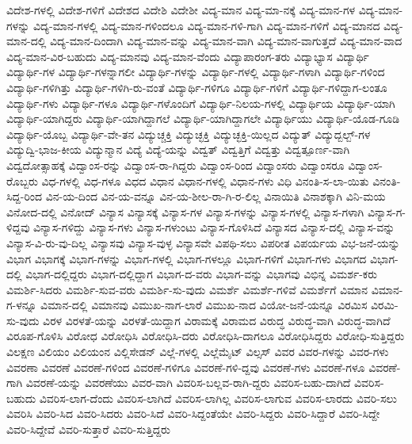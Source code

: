 {ವಿದೇಶ-ಗಳಲ್ಲಿ
ವಿದೇಶ-ಗಳಿಗೆ
ವಿದೇಶದ
ವಿದೇಶಿ
ವಿದೇಶೀ
ವಿದ್ಯ-ಮಾನ
ವಿದ್ಯ-ಮಾ-ನಕ್ಕೆ
ವಿದ್ಯ-ಮಾನ-ಗಳ
ವಿದ್ಯ-ಮಾನ-ಗಳನ್ನು
ವಿದ್ಯ-ಮಾನ-ಗಳಲ್ಲಿ
ವಿದ್ಯ-ಮಾನ-ಗಳಿಂದಲೂ
ವಿದ್ಯ-ಮಾನ-ಗಳಿ-ಗಾಗಿ
ವಿದ್ಯ-ಮಾನ-ಗಳಿಗೆ
ವಿದ್ಯ-ಮಾನದ
ವಿದ್ಯ-ಮಾನ-ದಲ್ಲಿ
ವಿದ್ಯ-ಮಾನ-ದಿಂದಾಗಿ
ವಿದ್ಯ-ಮಾನ-ವನ್ನು
ವಿದ್ಯ-ಮಾನ-ವಾಗಿ
ವಿದ್ಯ-ಮಾನ-ವಾಗುತ್ತದೆ
ವಿದ್ಯ-ಮಾನ-ವಾದ
ವಿದ್ಯ-ಮಾನ-ವಿರ-ಬಹುದು
ವಿದ್ಯ-ಮಾನವು
ವಿದ್ಯ-ಮಾನ-ವೆಂದು
ವಿದ್ಯಾಪಾರಂಗ-ತರು
ವಿದ್ಯಾಭ್ಯಾಸ
ವಿದ್ಯಾರ್ಥಿ
ವಿದ್ಯಾರ್ಥಿ-ಗಳ
ವಿದ್ಯಾರ್ಥಿ-ಗಳನ್ನಾಗಲೀ
ವಿದ್ಯಾರ್ಥಿ-ಗಳನ್ನು
ವಿದ್ಯಾರ್ಥಿ-ಗಳಲ್ಲಿ
ವಿದ್ಯಾರ್ಥಿ-ಗಳಾಗಿ
ವಿದ್ಯಾರ್ಥಿ-ಗಳಿಂದ
ವಿದ್ಯಾರ್ಥಿ-ಗಳಿಗಿತ್ತು
ವಿದ್ಯಾರ್ಥಿ-ಗಳಿಗಿ-ರು-ವಂತೆ
ವಿದ್ಯಾರ್ಥಿ-ಗಳಿಗೂ
ವಿದ್ಯಾರ್ಥಿ-ಗಳಿಗೆ
ವಿದ್ಯಾರ್ಥಿ-ಗಳಿದ್ದಾಗ-ಲಂತೂ
ವಿದ್ಯಾರ್ಥಿ-ಗಳು
ವಿದ್ಯಾರ್ಥಿ-ಗಳೂ
ವಿದ್ಯಾರ್ಥಿ-ಗಳೊಂದಿಗೆ
ವಿದ್ಯಾರ್ಥಿ-ನಿಲಯ-ಗಳಲ್ಲಿ
ವಿದ್ಯಾರ್ಥಿಯ
ವಿದ್ಯಾರ್ಥಿ-ಯಾಗಿ
ವಿದ್ಯಾರ್ಥಿ-ಯಾಗಿದ್ದರು
ವಿದ್ಯಾರ್ಥಿ-ಯಾಗಿದ್ದಾಗಲೆ
ವಿದ್ಯಾರ್ಥಿ-ಯಾಗಿದ್ದಾಗಲೇ
ವಿದ್ಯಾರ್ಥಿಯು
ವಿದ್ಯಾರ್ಥಿ-ಯೊಡ-ಗೂಡಿ
ವಿದ್ಯಾರ್ಥಿ-ಯೊಬ್ಬ
ವಿದ್ಯಾರ್ಥಿ-ವೇ-ತನ
ವಿದ್ಯುಚ್ಚಕ್ತಿ
ವಿದ್ಯುಚ್ಛಕ್ತಿ
ವಿದ್ಯುಚ್ಛಕ್ತಿ-ಯಿಲ್ಲದ
ವಿದ್ಯುತ್
ವಿದ್ಯುದ್ಬಲ್ಬ್-ಗಳ
ವಿದ್ಯುದ್ವಿ-ಭಾಜ-ಕೀಯ
ವಿದ್ಯುನ್ಮಾನ
ವಿದ್ಯೆ
ವಿದ್ಯೆ-ಯನ್ನು
ವಿದ್ವತ್
ವಿದ್ವತ್ತಿಗೆ
ವಿದ್ವತ್ತು
ವಿದ್ವತ್ಪೂರ್ಣ-ವಾಗಿ
ವಿದ್ವದೋತ್ಸಾಹಕ್ಕೆ
ವಿದ್ವಾಂಸ-ರನ್ನು
ವಿದ್ವಾಂಸ-ರಾ-ಗಿದ್ದರು
ವಿದ್ವಾಂಸ-ರಿಂದ
ವಿದ್ವಾಂಸರು
ವಿದ್ವಾಂಸರೂ
ವಿದ್ವಾಂಸ-ರೊಬ್ಬರು
ವಿಧ-ಗಳಲ್ಲಿ
ವಿಧ-ಗಳೂ
ವಿಧದ
ವಿಧಾನ
ವಿಧಾನ-ಗಳಲ್ಲಿ
ವಿಧಾನ-ಗಳು
ವಿಧಿ
ವಿನಂತಿ-ಸ-ಲಾ-ಯಿತು
ವಿನಂತಿ-ಸಿದ್ದ-ರಿಂದ
ವಿನ-ಯ-ದಿಂದ
ವಿನ-ಯ-ವನ್ನೂ
ವಿನ-ಯ-ಶೀಲ-ರಾ-ಗಿ-ರ-ಲಿಲ್ಲ
ವಿನಾಯಿತಿ
ವಿನಾಶಕ್ಕಾಗಿ
ವಿನಿ-ಮಯ
ವಿನೋದ-ದಲ್ಲಿ
ವಿನೋದ್
ವಿನ್ಯಾಸ
ವಿನ್ಯಾಸಕ್ಕೆ
ವಿನ್ಯಾಸ-ಗಳ
ವಿನ್ಯಾಸ-ಗಳನ್ನು
ವಿನ್ಯಾಸ-ಗಳಲ್ಲಿ
ವಿನ್ಯಾಸ-ಗಳಾಗಿ
ವಿನ್ಯಾಸ-ಗ-ಳಿದ್ದವು
ವಿನ್ಯಾಸ-ಗಳಿದ್ದು
ವಿನ್ಯಾಸ-ಗಳು
ವಿನ್ಯಾಸ-ಗಳುಂಟು
ವಿನ್ಯಾಸ-ಗೊಳಿಸಿದೆ
ವಿನ್ಯಾಸದ
ವಿನ್ಯಾಸ-ದಲ್ಲಿ
ವಿನ್ಯಾಸ-ವನ್ನು
ವಿನ್ಯಾಸ-ವಿ-ರು-ವು-ದಿಲ್ಲ
ವಿನ್ಯಾಸವು
ವಿನ್ಯಾಸ-ವುಳ್ಳ
ವಿನ್ಯಾಸವೇ
ವಿಪಥಿ-ಸಲು
ವಿಪರೀತ
ವಿಪರ್ಯಯ
ವಿಭ-ಜನೆ-ಯನ್ನು
ವಿಭಾಗ
ವಿಭಾಗಕ್ಕೆ
ವಿಭಾಗ-ಗಳನ್ನು
ವಿಭಾಗ-ಗಳಲ್ಲಿ
ವಿಭಾಗ-ಗಳಲ್ಲೂ
ವಿಭಾಗ-ಗಳಿಗೆ
ವಿಭಾಗ-ಗಳು
ವಿಭಾಗದ
ವಿಭಾಗ-ದಲ್ಲಿ
ವಿಭಾಗ-ದಲ್ಲಿದ್ದರು
ವಿಭಾಗ-ದಲ್ಲಿದ್ದಾಗ
ವಿಭಾಗ-ದ-ವರು
ವಿಭಾಗ-ವನ್ನು
ವಿಭಾಗವು
ವಿಭಿನ್ನ
ವಿಮರ್ಶ-ಕರು
ವಿಮರ್ಶಿ-ಸಿದರು
ವಿಮರ್ಶಿ-ಸುವ-ವರು
ವಿಮರ್ಶಿ-ಸು-ವುದು
ವಿಮರ್ಶೆ
ವಿಮರ್ಶೆ-ಗಳಿವೆ
ವಿಮರ್ಶೆಗೆ
ವಿಮಾನ
ವಿಮಾನ-ಗ-ಳನ್ನೂ
ವಿಮಾನ-ದಲ್ಲಿ
ವಿಮಾನವು
ವಿಮುಖ-ನಾಗ-ಲಾರೆ
ವಿಮುಖ-ನಾದ
ವಿಯೋ-ಜನೆ-ಯನ್ನೂ
ವಿರಮಿಸ
ವಿರಮಿ-ಸು-ವುದು
ವಿರಳ
ವಿರಳತೆ-ಯನ್ನು
ವಿರಳತೆ-ಯಿದ್ದಾಗ
ವಿರಾಮಕ್ಕೆ
ವಿರಾಮದ
ವಿರುದ್ಧ
ವಿರುದ್ಧ-ವಾಗಿ
ವಿರುದ್ಧ-ವಾಗಿದೆ
ವಿರೂಪ-ಗೊಳಿಸಿ
ವಿರೋಧ
ವಿರೋಧಿಸಿ
ವಿರೋಧಿಸಿ-ದರು
ವಿರೋಧಿಸಿ-ದಾಗಲೂ
ವಿರೋಧಿಸಿದ್ದರು
ವಿರೋಧಿ-ಸುತ್ತಿದ್ದರು
ವಿಲಕ್ಷಣ
ವಿಲಿಯಂ
ವಿಲಿಯಂನ
ವಿಲ್ಲಿಸೇಡನ್
ವಿಲ್ಲೆ-ಗಳಲ್ಲಿ
ವಿಲ್ಲೆಮೈಟ್
ವಿಲ್ಸಸ್
ವಿವರ
ವಿವರ-ಗಳನ್ನು
ವಿವರ-ಗಳು
ವಿವರಣಾ
ವಿವರಣೆ
ವಿವರಣೆ-ಗಳಿಂದ
ವಿವರಣೆ-ಗಳಿಗೂ
ವಿವರಣೆ-ಗಳಿ-ದ್ದವು
ವಿವರಣೆ-ಗಳು
ವಿವರಣೆ-ಗಳೂ
ವಿವರಣೆ-ಗಾಗಿ
ವಿವರಣೆ-ಯನ್ನು
ವಿವರಣೆಯು
ವಿವರ-ವಾಗಿ
ವಿವರಿಸ-ಬಲ್ಲವ-ರಾಗಿ-ದ್ದರು
ವಿವರಿಸ-ಬಹು-ದಾಗಿದೆ
ವಿವರಿಸ-ಬಹುದು
ವಿವರಿಸ-ಲಾಗ-ದೆಂದು
ವಿವರಿಸ-ಲಾಗಿದೆ
ವಿವರಿಸ-ಲಾಗಿಲ್ಲ
ವಿವರಿಸ-ಲಾಗುವ
ವಿವರಿಸ-ಲಾರದು
ವಿವರಿ-ಸಲು
ವಿವರಿಸಿ
ವಿವರಿ-ಸಿದ
ವಿವರಿ-ಸಿದರು
ವಿವರಿ-ಸಿದೆ
ವಿವರಿ-ಸಿದ್ದಂತೆಯೇ
ವಿವರಿ-ಸಿದ್ದರು
ವಿವರಿ-ಸಿದ್ದಾರೆ
ವಿವರಿ-ಸಿದ್ದೇ
ವಿವರಿ-ಸಿದ್ದೇವೆ
ವಿವರಿ-ಸುತ್ತಾರೆ
ವಿವರಿ-ಸುತ್ತಿದ್ದರು
}
